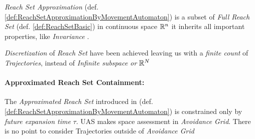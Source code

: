     \begin{note}
        \emph{Reach Set Approximation} (def. \ref{def:ReachSetApproximationByMovementAutomaton}) is a subset of \emph{Full Reach Set} (def. \ref{def:ReachSetBasic}) in continuous space $\mathbb{R}^n$ it inherits all important properties, like \emph{Invariance} \cite{blanchini1999set}.
        
        \emph{Discretization} of \emph{Reach Set} have been achieved leaving us with a \emph{finite count} of \emph{Trajectories}, instead of \emph{Infinite subspace or $\mathbb{R}^N$}
    \end{note}

    \paragraph{Approximated Reach Set Containment:} The \emph{Approximated Reach Set} introduced in (def. \ref{def:ReachSetApproximationByMovementAutomaton}) is constrained only by \emph{future expansion time} $\tau$. UAS makes space assessment in \emph{Avoidance Grid}. There is no point to consider Trajectories outside of \emph{Avoidance Grid}
    
